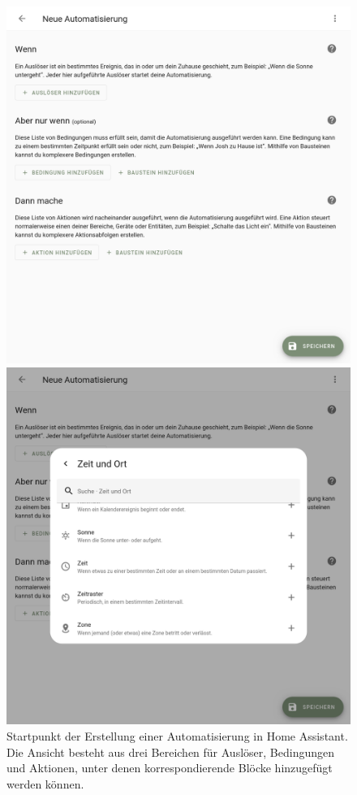 \begin{figure}[!ht]
  \begin{minipage}[t]{\hascwidth}
    \includegraphics[width=\linewidth]{assets/hassio-automation-empty.png}
    \caption[Erstellung einer Automatisierung in Home Assistant]{Startpunkt der Erstellung einer Automatisierung in Home Assistant. Die Ansicht besteht aus drei Bereichen für Auslöser, Bedingungen und Aktionen, unter denen korrespondierende Blöcke hinzugefügt werden können.}
    \label{fig:hassio-automation-empty}
  \end{minipage}
  \hfill
  \begin{minipage}[t]{\hascwidth}
    \includegraphics[width=\linewidth]{assets/hassio-automation-trigger-select-2.png}

\end{minipage}
\end{figure}
